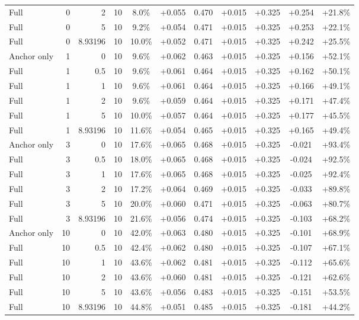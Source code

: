 \begin{table}[htbp]
\begin{tabular}{lrrrccccccc}
Full & 0 & 2 & 10 & 8.0\% & +0.055 & 0.470 & +0.015 & +0.325 & +0.254 & +21.8\% \\
Full & 0 & 5 & 10 & 9.2\% & +0.054 & 0.471 & +0.015 & +0.325 & +0.253 & +22.1\% \\
Full & 0 & 8.93196 & 10 & 10.0\% & +0.052 & 0.471 & +0.015 & +0.325 & +0.242 & +25.5\% \\
Anchor only & 1 & 0 & 10 & 9.6\% & +0.062 & 0.463 & +0.015 & +0.325 & +0.156 & +52.1\% \\
Full & 1 & 0.5 & 10 & 9.6\% & +0.061 & 0.464 & +0.015 & +0.325 & +0.162 & +50.1\% \\
Full & 1 & 1 & 10 & 9.6\% & +0.061 & 0.464 & +0.015 & +0.325 & +0.166 & +49.1\% \\
Full & 1 & 2 & 10 & 9.6\% & +0.059 & 0.464 & +0.015 & +0.325 & +0.171 & +47.4\% \\
Full & 1 & 5 & 10 & 10.0\% & +0.057 & 0.464 & +0.015 & +0.325 & +0.177 & +45.5\% \\
Full & 1 & 8.93196 & 10 & 11.6\% & +0.054 & 0.465 & +0.015 & +0.325 & +0.165 & +49.4\% \\
Anchor only & 3 & 0 & 10 & 17.6\% & +0.065 & 0.468 & +0.015 & +0.325 & -0.021 & +93.4\% \\
Full & 3 & 0.5 & 10 & 18.0\% & +0.065 & 0.468 & +0.015 & +0.325 & -0.024 & +92.5\% \\
Full & 3 & 1 & 10 & 17.6\% & +0.065 & 0.468 & +0.015 & +0.325 & -0.025 & +92.4\% \\
Full & 3 & 2 & 10 & 17.2\% & +0.064 & 0.469 & +0.015 & +0.325 & -0.033 & +89.8\% \\
Full & 3 & 5 & 10 & 20.0\% & +0.060 & 0.471 & +0.015 & +0.325 & -0.063 & +80.7\% \\
Full & 3 & 8.93196 & 10 & 21.6\% & +0.056 & 0.474 & +0.015 & +0.325 & -0.103 & +68.2\% \\
Anchor only & 10 & 0 & 10 & 42.0\% & +0.063 & 0.480 & +0.015 & +0.325 & -0.101 & +68.9\% \\
Full & 10 & 0.5 & 10 & 42.4\% & +0.062 & 0.480 & +0.015 & +0.325 & -0.107 & +67.1\% \\
Full & 10 & 1 & 10 & 43.6\% & +0.062 & 0.481 & +0.015 & +0.325 & -0.112 & +65.6\% \\
Full & 10 & 2 & 10 & 43.6\% & +0.060 & 0.481 & +0.015 & +0.325 & -0.121 & +62.6\% \\
Full & 10 & 5 & 10 & 43.6\% & +0.056 & 0.483 & +0.015 & +0.325 & -0.151 & +53.5\% \\
Full & 10 & 8.93196 & 10 & 44.8\% & +0.051 & 0.485 & +0.015 & +0.325 & -0.181 & +44.2\% \\

\end{tabular}
\end{table}

